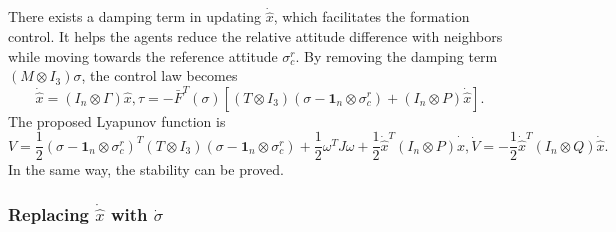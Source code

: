 There exists a damping term in updating $ \dot{\hat{{x}}} $, which facilitates the formation control. 
It helps the agents reduce the relative attitude difference with neighbors while moving towards the reference attitude $ \sigma^{r}_{c} $.
By removing the damping term $ ( M \otimes I_{3} ) \sigma $, the control law becomes
\begin{subequations}
\label{eq:coop_att_syn:ctrl_law:mult_agt:2}
\begin{equation}
\label{eq:coop_att_syn:ctrl_law:mult_agt:2:a}
\dot{\hat{x}} = ( I_{n} \otimes \Gamma ) \hat{x}  ,
\end{equation}
\begin{equation}
\label{eq:coop_att_syn:ctrl_law:mult_agt:2:b}
\tau = - \bar{F}^{T}(\sigma) [ ( T \otimes I_{3} )( \sigma - \mathbf{1}_{n} \otimes \sigma^{r}_{c} ) + ( I_{n} \otimes P ) \dot{ \hat{x} } ] .
\end{equation}
\end{subequations}
The proposed Lyapunov function is
\begin{subequations}
\label{eq:coop_att_sync:lyapunov_func:2}
\begin{equation}
V = \frac{1}{2} ( \sigma - \mathbf{1}_{n} \otimes \sigma^{r}_{c} )^{T} ( T \otimes I_{3} ) ( \sigma - \mathbf{1}_{n} \otimes \sigma^{r}_{c} ) + \frac{1}{2} \omega^{T} J \omega + \frac{1}{2} \dot{\hat{x}}^{T} ( I_{n} \otimes P ) \dot{\hat{x}},
\end{equation}
\begin{equation}
\dot{V} = - \frac{1}{2} \dot{\hat{x}}^{T} (I_{n} \otimes Q ) \dot{\hat{x}}.
\end{equation}
\end{subequations}
In the same way, the stability can be proved.

\subsubsection{Replacing $ \dot{\hat{x}} $ with $ \dot{\sigma} $ }
\label{sec:coop_att_syn:analysis:b}


